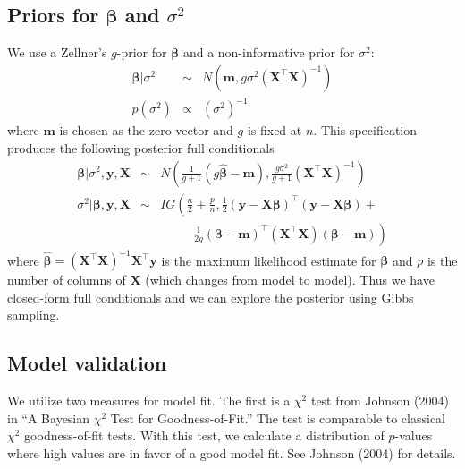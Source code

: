 \documentclass{asaproc}
\newcommand{\m}[1]{\mathbf{\bm{#1}}}
\begin{document}

\subsection{Priors for $\m{\beta}$ and $\sigma^2$}

We use a Zellner's $g$-prior for $\m{\beta}$ and a non-informative prior for $\sigma^2$:
\begin{eqnarray*}
\m{\beta}|\sigma^2 &\sim& N(\m{m}, g\sigma^2(\m{X}^\top\m{X})^{-1}) \\
p(\sigma^2) &\propto& (\sigma^2)^{-1}
\end{eqnarray*}
where $\m{m}$ is chosen as the zero vector and $g$ is fixed at $n$. This specification produces the following posterior full conditionals
\begin{eqnarray*}
\m{\beta}|\sigma^2, \m{y}, \m{X} &\sim& N\left(\frac{1}{g+1}(g\hat{\m{\beta}}-\m{m}), \frac{g\sigma^2}{g+1}(\m{X}^\top\m{X})^{-1}\right) \\
\sigma^2|\m{\beta}, \m{y}, \m{X} &\sim& IG\left(\frac{n}{2}+\frac{p}{n}, \frac{1}{2}(\m{y}-\m{X}\m{\beta})^\top(\m{y}-\m{X}\m{\beta})\right.+ \\
& & ~~~~ ~~~~ ~~~~ \left.\frac{1}{2g}(\m{\beta}-\m{m})^\top(\m{X}^\top\m{X})(\m{\beta}-\m{m})\right)
\end{eqnarray*}
where $\hat{\m{\beta}}=(\m{X}^\top\m{X})^{-1}\m{X}^\top\m{y}$ is the maximum likelihood estimate for $\m{\beta}$ and $p$ is the number of columns of $\m{X}$ (which changes from model to model). Thus we have closed-form full conditionals and we can explore the posterior using Gibbs sampling.

\subsection{Model validation}

We utilize two measures for model fit. The first is a $\chi^2$ test from Johnson (2004) in ``A Bayesian $\chi^2$ Test for Goodness-of-Fit.'' The test is comparable to classical $\chi^2$ goodness-of-fit tests. With this test, we calculate a distribution of $p$-values where high values are in favor of a good model fit. See Johnson (2004) for details.
\end{document}
